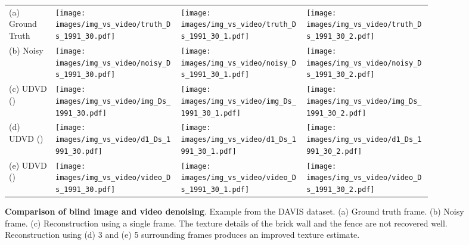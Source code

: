 \documentclass[final]{cvpr}
\begin{document}
\def\nsp{\hspace*{-.07in}}\begin{figure*}

     \def\f1ht{\linewidth}

     \begin{tabular}{>{\centering\arraybackslash}m{0.1\linewidth} 
     >{\centering\arraybackslash}m{0.27\linewidth}
     >{\centering\arraybackslash}m{0.27\linewidth}
     >{\centering\arraybackslash}m{0.27\linewidth}}
     
    \footnotesize{(a) Ground Truth} & 
    \texttt{[image: images/img\_vs\_video/truth\_Ds\_1991\_30.pdf]}\nsp \nsp &
    \texttt{[image: images/img\_vs\_video/truth\_Ds\_1991\_30\_1.pdf]}\nsp \nsp &
    \texttt{[image: images/img\_vs\_video/truth\_Ds\_1991\_30\_2.pdf]} \\

    \footnotesize{(b) Noisy} & 
    \texttt{[image: images/img\_vs\_video/noisy\_Ds\_1991\_30.pdf]}\nsp \nsp &
    \texttt{[image: images/img\_vs\_video/noisy\_Ds\_1991\_30\_1.pdf]}\nsp \nsp &
    \texttt{[image: images/img\_vs\_video/noisy\_Ds\_1991\_30\_2.pdf]} \\

    \footnotesize{(c) UDVD ()} & 
    \texttt{[image: images/img\_vs\_video/img\_Ds\_1991\_30.pdf]}\nsp \nsp &
    \texttt{[image: images/img\_vs\_video/img\_Ds\_1991\_30\_1.pdf]}\nsp \nsp &
    \texttt{[image: images/img\_vs\_video/img\_Ds\_1991\_30\_2.pdf]} \\

    \footnotesize{(d) UDVD ()} & 
    \texttt{[image: images/img\_vs\_video/d1\_Ds\_1991\_30.pdf]}\nsp \nsp &
    \texttt{[image: images/img\_vs\_video/d1\_Ds\_1991\_30\_1.pdf]}\nsp \nsp &
    \texttt{[image: images/img\_vs\_video/d1\_Ds\_1991\_30\_2.pdf]} \\

    \footnotesize{(e) UDVD ()} & 
    \texttt{[image: images/img\_vs\_video/video\_Ds\_1991\_30.pdf]}\nsp \nsp &
    \texttt{[image: images/img\_vs\_video/video\_Ds\_1991\_30\_1.pdf]}\nsp \nsp &
    \texttt{[image: images/img\_vs\_video/video\_Ds\_1991\_30\_2.pdf]} \\

     \end{tabular}
\caption{\textbf{Comparison of blind image and video denoising}. Example from the DAVIS dataset. (a) Ground truth frame. (b) Noisy frame. (c) Reconstruction using a single frame. The texture details of the brick wall and the fence are not recovered well. Reconstruction using (d) 3 and (e) 5 surrounding frames produces an improved texture estimate.}
 \label{fig:img_vs_video}
\end{figure*}
\end{document}
